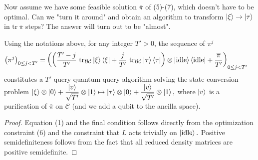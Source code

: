 \documentclass{article}
\begin{document}
Now assume we have some feasible solution $\displaystyle \overline{\pi }$ of (5)-(7), which doesn't have to be optimal. Can we "turn it around" and obtain an algorithm to transform $\displaystyle \ket{\xi }\rightarrow \ket{\tau }$ in $\displaystyle \mathrm{tr} \ \overline{\pi }$ steps? The answer will turn out to be "almost".
\begin{proposition}
Using the notations above, for any integer $\displaystyle T' >0$, the sequence of $\displaystyle \pi ^{j}$
\begin{align*}
\left( \pi ^{j}\right)_{0\leq j< T'} & =\left(\left(\frac{T'-j}{T'} \ \mathrm{tr}_{\mathcal{BC}}\ket{\xi }\bra{\xi } +\frac{j}{T'} \ \mathrm{tr}_{\mathcal{BC}}\ket{\tau }\bra{\tau }\right) \otimes \ket{\mathrm{idle}}\bra{\mathrm{idle}} +\frac{\overline{\pi }}{T'}\right)_{0\leq j< T'}
\end{align*}
constitutes a $\displaystyle T'$-query quantum query algorithm solving the state conversion problem $\displaystyle \ket{\xi } \otimes \ket{0} +\frac{\ket{v}}{\sqrt{T'}} \otimes \ket{1} \mapsto \ket{\tau } \otimes \ket{0} +\frac{\ket{v}}{\sqrt{T'}} \otimes \ket{1} ,$ where $\displaystyle \ket{v}$ is a purification of $\displaystyle \overline{\pi }$ on $\displaystyle \mathcal{C}$ (and we add a qubit to the ancilla space).
\end{proposition}
\begin{proof}
Equation (1) and the final condition follows directly from the optimization constraint (6) and the constraint that $\displaystyle L$ acts trivially on $\displaystyle \ket{\mathrm{idle}} .$ Positive semidefiniteness follows from the fact that all reduced density matrices are positive semidefinite.
\end{proof}
\end{document}

